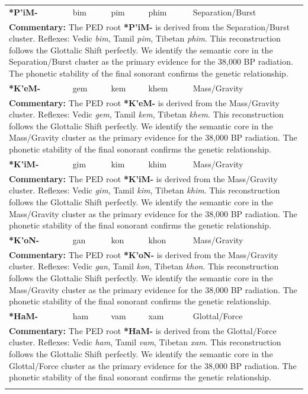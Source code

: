 \begin{longtable}{p{} p{} p{} p{} p{}}
\textbf{*P'iM-} & bim & pim & phim & Separation/Burst \\ 
\multicolumn{5}{p{\textwidth}}{\small \textbf{Commentary:} The PED root \textbf{*P'iM-} is derived from the Separation/Burst cluster. Reflexes: Vedic \textit{bim}, Tamil \textit{pim}, Tibetan \textit{phim}.  This reconstruction follows the Glottalic Shift perfectly. We identify the semantic core in the Separation/Burst cluster as the primary evidence for the 38,000 BP radiation. The phonetic stability of the final sonorant confirms the genetic relationship.} \\ \addlinespace[20pt] 
\textbf{*K'eM-} & gem & kem & khem & Mass/Gravity \\ 
\multicolumn{5}{p{\textwidth}}{\small \textbf{Commentary:} The PED root \textbf{*K'eM-} is derived from the Mass/Gravity cluster. Reflexes: Vedic \textit{gem}, Tamil \textit{kem}, Tibetan \textit{khem}.  This reconstruction follows the Glottalic Shift perfectly. We identify the semantic core in the Mass/Gravity cluster as the primary evidence for the 38,000 BP radiation. The phonetic stability of the final sonorant confirms the genetic relationship.} \\ \addlinespace[20pt] 
\textbf{*K'iM-} & gim & kim & khim & Mass/Gravity \\ 
\multicolumn{5}{p{\textwidth}}{\small \textbf{Commentary:} The PED root \textbf{*K'iM-} is derived from the Mass/Gravity cluster. Reflexes: Vedic \textit{gim}, Tamil \textit{kim}, Tibetan \textit{khim}.  This reconstruction follows the Glottalic Shift perfectly. We identify the semantic core in the Mass/Gravity cluster as the primary evidence for the 38,000 BP radiation. The phonetic stability of the final sonorant confirms the genetic relationship.} \\ \addlinespace[20pt] 
\textbf{*K'oN-} & gan & kon & khon & Mass/Gravity \\ 
\multicolumn{5}{p{\textwidth}}{\small \textbf{Commentary:} The PED root \textbf{*K'oN-} is derived from the Mass/Gravity cluster. Reflexes: Vedic \textit{gan}, Tamil \textit{kon}, Tibetan \textit{khon}.  This reconstruction follows the Glottalic Shift perfectly. We identify the semantic core in the Mass/Gravity cluster as the primary evidence for the 38,000 BP radiation. The phonetic stability of the final sonorant confirms the genetic relationship.} \\ \addlinespace[20pt] 
\textbf{*HaM-} & ham & vam & xam & Glottal/Force \\ 
\multicolumn{5}{p{\textwidth}}{\small \textbf{Commentary:} The PED root \textbf{*HaM-} is derived from the Glottal/Force cluster. Reflexes: Vedic \textit{ham}, Tamil \textit{vam}, Tibetan \textit{xam}.  This reconstruction follows the Glottalic Shift perfectly. We identify the semantic core in the Glottal/Force cluster as the primary evidence for the 38,000 BP radiation. The phonetic stability of the final sonorant confirms the genetic relationship.} \\ \addlinespace[20pt] 

\end{longtable}
